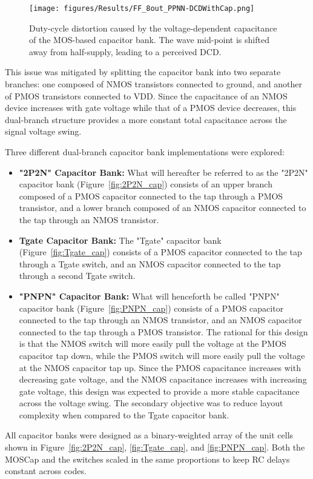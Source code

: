 \begin{figure}[h]
  \centering
  \texttt{[image: figures/Results/FF\_8out\_PPNN-DCDWithCap.png]}
  \caption{Duty-cycle distortion caused by the voltage-dependent capacitance of the MOS-based capacitor bank. The wave mid-point is shifted away from half-supply, leading to a perceived DCD.}
  \label{fig:FF_CapDCD}
\end{figure}

This issue was mitigated by splitting the capacitor bank into two separate branches: one composed of NMOS transistors connected to ground, and another of PMOS transistors connected to VDD. Since the capacitance of an NMOS device increases with gate voltage while that of a PMOS device decreases, this dual-branch structure provides a more constant total capacitance across the signal voltage swing.

Three different dual-branch capacitor bank implementations were explored:
\begin{itemize}
    \item \textbf{"2P2N" Capacitor Bank:} What will hereafter be referred to as the "2P2N" capacitor bank (Figure~\ref{fig:2P2N_cap}) consists of an upper branch composed of a PMOS capacitor connected to the tap through a PMOS transistor, and a lower branch composed of an NMOS capacitor connected to the tap through an NMOS transistor. 
    \item \textbf{Tgate Capacitor Bank:} The "Tgate" capacitor bank (Figure~\ref{fig:Tgate_cap}) consists of a PMOS capacitor connected to the tap through a Tgate switch, and an NMOS capacitor connected to the tap through a second Tgate switch.
    \item \textbf{"PNPN" Capacitor Bank:} What will henceforth be called "PNPN" capacitor bank (Figure~\ref{fig:PNPN_cap}) consists of a PMOS capacitor connected to the tap through an NMOS transistor, and an NMOS capacitor connected to the tap through a PMOS transistor. The rational for this design is that the NMOS switch will more easily pull the voltage at the PMOS capacitor tap down, while the PMOS switch will more easily pull the voltage at the NMOS capacitor tap up. Since the PMOS capacitance increases with decreasing gate voltage, and the NMOS capacitance increases with increasing gate voltage, this design was expected to provide a more stable capacitance across the voltage swing. The secondary objective was to reduce layout complexity when compared to the Tgate capacitor bank.
\end{itemize}
All capacitor banks were designed as a binary-weighted array of the unit cells shown in Figure~\ref{fig:2P2N_cap}, \ref{fig:Tgate_cap}, and \ref{fig:PNPN_cap}. Both the MOSCap and the switches scaled in the same proportions to keep RC delays constant across codes. 

